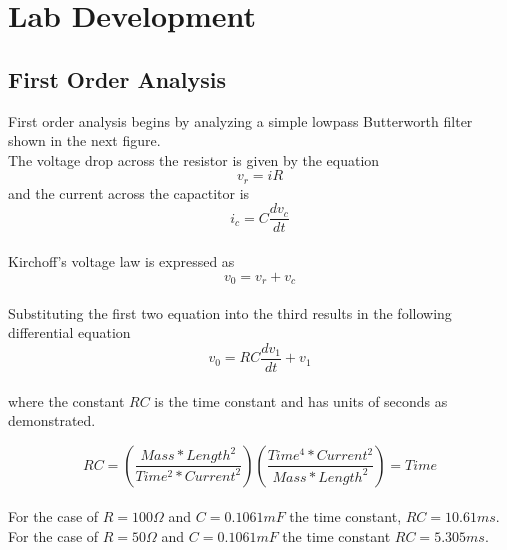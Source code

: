 \documentclass[main.tex]{subfiles}
\begin{document}
	\section[Lab Development]{Lab Development}
	\subsection[First Order Analysis]{First Order Analysis}
	
	First order analysis begins by analyzing a simple lowpass Butterworth filter shown in the next figure.
	\\
	The voltage drop across the resistor is given by the equation
	\[v_{r} = iR\] and the current across the capactitor is 
	\[i_{c} = C \frac{d v_{c}}{dt}\]
	\\Kirchoff's voltage law is expressed as
	\[v_{0} = v_{r} + v_{c}\]
	\\
	Substituting the first two equation into the third results in the following differential equation
	\[v_{0} = RC \frac{d v_{1}}{dt} + v_{1}\]
	\\where the constant \(RC\) is the time constant and has units of seconds as demonstrated.
	
	
	\[RC = (\frac{Mass * Length^2}{Time^2 * Current^2} )(\frac{Time^4 * Current^2}{Mass * Length^2}) = Time\]
	\\
	For the case of \(R = 100\Omega\) and \(C = 0.1061 mF\) the time constant, \(RC = 10.61 ms\). For the case of \(R=50\Omega\) and \(C=0.1061mF\) the time constant \(RC=5.305ms\).
	
\end{document}
